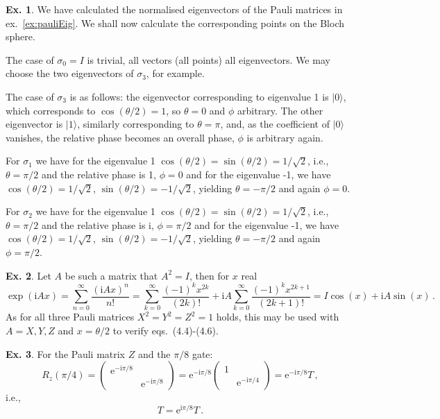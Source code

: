 \documentclass[a4paper,12pt]{article}
\def\e{\mathrm{e}}
\def\imagi{\mathrm{i}}
\theoremstyle{definition}
\newtheorem{exercise}{Ex.}[section]
\begin{document}
\begin{exercise}
 We have calculated the normalised eigenvectors of the Pauli matrices in ex.~\ref{ex:pauliEig}. We shall now calculate the corresponding points on the Bloch sphere.
 
 The case of $\sigma_0 =I$ is trivial, all vectors (all points) all eigenvectors. We may choose the two eigenvectors of $\sigma_3$, for example.
 
 The case of $\sigma_3$ is as follows: the eigenvector corresponding to eigenvalue 1 is $|0\rangle$, which corresponds to $\cos(\theta/2) = 1$, so $\theta=0$ and $\phi$ arbitrary. The other eigenvector is $|1\rangle$, similarly corresponding to $\theta = \pi$, and, as the coefficient of $|0\rangle$ vanishes, the relative phase becomes an overall phase, $\phi$ is arbitrary again.
 
 For $\sigma_1$ we have for the eigenvalue 1 $\cos(\theta/2) = \sin(\theta/2) = 1/\sqrt{2}$, i.e., $\theta=\pi/2$ and the relative phase is 1, $\phi=0$ and for the eigenvalue -1, we have $\cos(\theta/2) = 1/\sqrt{2}$, $\sin(\theta/2) = -1/\sqrt{2}$, yielding $\theta=-\pi/2$ and again $\phi=0$.
 
 For $\sigma_2$ we have for the eigenvalue 1 $\cos(\theta/2) = \sin(\theta/2) = 1/\sqrt{2}$, i.e., $\theta=\pi/2$ and the relative phase is $\imagi$, $\phi=\pi/2$ and for the eigenvalue -1, we have $\cos(\theta/2) = 1/\sqrt{2}$, $\sin(\theta/2) = -1/\sqrt{2}$, yielding $\theta=-\pi/2$ and again $\phi=\pi/2$.
\end{exercise}

\begin{exercise}
 Let $A$ be such a matrix that $A^2=I$, then for $x$ real
 \[
  \exp(\imagi A x) = \sum_{n=0}^\infty \frac{(\imagi A x)^n}{n!} = \sum_{k=0}^\infty \frac{(-1)^k x^{2k}}{(2k)!} +\imagi A \sum_{k=0}^\infty \frac{(-1)^k x^{2k+1}}{(2k+1)!} = I \cos(x) + \imagi A \sin(x)\,.
 \]
 As for all three Pauli matrices $X^2=Y^2=Z^2=1$ holds, this may be used with $A=X, Y, Z$ and $x=\theta/2$ to verify eqs.\ (4.4)-(4.6).
\end{exercise}

\begin{exercise} For the Pauli matrix $Z$ and the $\pi/8$ gate:
 \[
  R_{z}(\pi/4) = \begin{pmatrix} \e^{-\imagi\pi/8} & \\ & \e^{-\imagi\pi/8} \end{pmatrix} = \e^{-\imagi\pi/8} \begin{pmatrix} 1 & \\ & \e^{-\imagi\pi/4} \end{pmatrix} = \e^{-\imagi\pi/8} T\,,
 \]
 i.e.,
 \[
  T = \e^{\imagi\pi/8} T\,.
 \]
\end{exercise}
\end{document}
